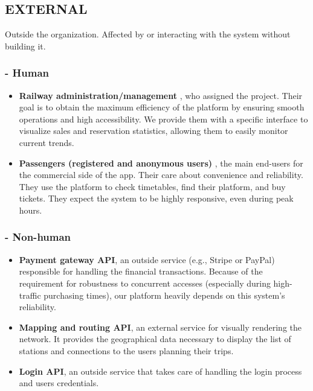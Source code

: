 \documentclass{article}
\begin{document}
\subsection{EXTERNAL}
Outside the organization. Affected by or interacting with the system without building it.

\subsubsection*{- Human}
\begin{itemize}
    \item \textbf{Railway administration/management} \label{STK1}, who assigned the project. Their goal is to obtain the maximum efficiency of the platform by ensuring smooth operations and high accessibility. We provide them with a specific interface to visualize sales and reservation statistics, allowing them to easily monitor current trends.
    \item \textbf{Passengers (registered and anonymous users)} \label{STK12}, the main end-users for the commercial side of the app. Their care about convenience and reliability. They use the platform to check timetables, find their platform, and buy tickets. They expect the system to be highly responsive, even during peak hours.
\end{itemize}

\subsubsection*{- Non-human}
\begin{itemize}
    \item \textbf{Payment gateway API}\label{STK16}, an outside service (e.g., Stripe or PayPal) responsible for handling the financial transactions. Because of the requirement for robustness to concurrent accesses (especially during high-traffic purchasing times), our platform heavily depends on this system's reliability.
    \item \textbf{Mapping and routing API}\label{STK17}, an external service for visually rendering the network. It provides the geographical data necessary to display the list of stations and connections to the users planning their trips.
    \item \textbf{Login API}\label{STK18}, an outside service that takes care of handling the login process and users credentials.
\end{itemize}

\newpage
\end{document}
